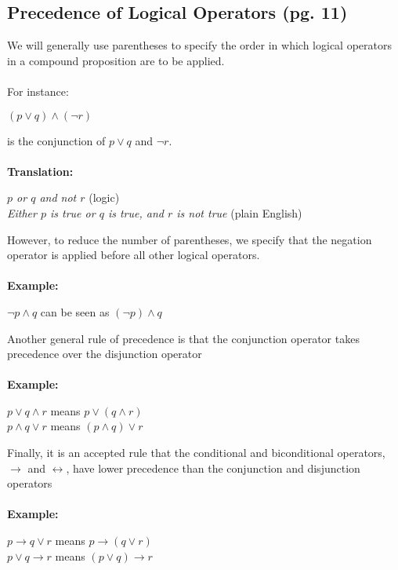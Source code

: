 \subsection*{Precedence of Logical Operators (pg. 11)}
\begin{tcolorbox}[colback=white, colframe=gray!60, title=Remark 1]
We will generally use parentheses to specify the order in which logical operators
in a compound proposition are to be applied. 
\\ \\ For instance:
\begin{center}
$(p \lor q) \land (\neg r)$    
\end{center}
is the conjunction of $p \lor q$ and $\neg r$.
\\ \\
\textbf{Translation:}
\begin{center}
\textit{$p$ or $q$ and not $r$} (logic) \\
\textit{Either $p$ is true or $q$ is true, and $r$ is not true} (plain English)
\end{center}
\end{tcolorbox}
\begin{tcolorbox}[colback=white, colframe=gray!60, title=Remark 2]
However, to reduce the number of parentheses, we specify that the negation
operator is applied before all other logical operators.
\\ \\
\textbf{Example:}
\begin{center}
$\neg p \land q$ can be seen as $(\neg p) \land q$    
\end{center}
\end{tcolorbox}
\begin{tcolorbox}[colback=white, colframe=gray!60, title=Remark 3]
Another general rule of precedence is that the conjunction operator takes precedence over
the disjunction operator
\\ \\
\textbf{Example:}
\begin{center}
$p \lor q \land r$ means $p \lor (q \land r)$ \\ 
$p \land q \lor r$ means $(p \land q) \lor r$
\end{center}
\end{tcolorbox}
\begin{tcolorbox}[colback=white, colframe=gray!60, title=Remark 4]
Finally, it is an accepted rule that the conditional and biconditional operators, $\rightarrow$ and $\leftrightarrow$,
have lower precedence than the conjunction and disjunction operators
\\ \\
\textbf{Example:}
\begin{center}
$p\rightarrow q \lor r $ means $p\rightarrow (q \lor r) $  \\ 
$p \lor q \rightarrow r$ means $(p \lor q)\rightarrow r$
\end{center}
\end{tcolorbox}
